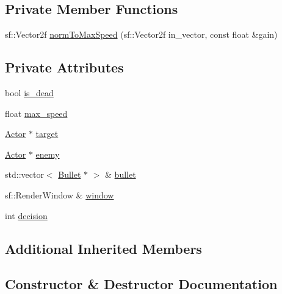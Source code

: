 \subsection*{Private Member Functions}
\begin{DoxyCompactItemize}
\item 
sf\+::\+Vector2f \hyperlink{class_ai_controler_aa388145d3791cd80b1d53a5847428f68}{norm\+To\+Max\+Speed} (sf\+::\+Vector2f in\+\_\+vector, const float \&gain)
\end{DoxyCompactItemize}
\subsection*{Private Attributes}
\begin{DoxyCompactItemize}
\item 
bool \hyperlink{class_ai_controler_aaf7042b1051e301b6b356bc6d702dccd}{is\+\_\+dead}
\item 
float \hyperlink{class_ai_controler_ab541f013a1b6ba763ec1bc4c183816d0}{max\+\_\+speed}
\item 
\hyperlink{class_actor}{Actor} $\ast$ \hyperlink{class_ai_controler_aa0130bc7fd057f94accf3aa3d542173b}{target}
\item 
\hyperlink{class_actor}{Actor} $\ast$ \hyperlink{class_ai_controler_a71e4c6c84203c1b50b6e1d55b582db62}{enemy}
\item 
std\+::vector$<$ \hyperlink{class_bullet}{Bullet} $\ast$ $>$ \& \hyperlink{class_ai_controler_a11a907d64a91c99ca5df9a908c1fdad7}{bullet}
\item 
sf\+::\+Render\+Window \& \hyperlink{class_ai_controler_ac352e418d681e34fb822a1d70c84fb05}{window}
\item 
int \hyperlink{class_ai_controler_a8d44859dfa97e10f04c532a0f2d69bfb}{decision}
\end{DoxyCompactItemize}
\subsection*{Additional Inherited Members}


\subsection{Constructor \& Destructor Documentation}
\hypertarget{class_ai_controler_a33bdaad21e07f2d93ae0ea277035193b}{}
